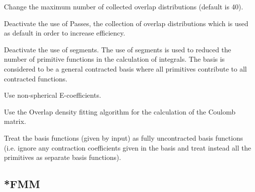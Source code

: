 \begin{description}
Change the maximum number of collected overlap distributions (default is 40).
\item[\Key{NO PASS}] Deactivate the use of Passes, the collection of overlap distributions which is used as default in order to increase efficiency. 
\item[\Key{NOSEGMENT}] Deactivate the use of segments. The use of segments is used to reduced the number of primitive functions in the calculation of integrals. The basis is considered to be a general contracted basis where all primitives contribute to all contracted functions. 
\item[\Key{NSETUV}] Use non-spherical E-coefficients.
\item[\Key{OVERLAP-DF-J}] Use the Overlap density fitting algorithm for the calculation of the Coulomb matrix.
\item[\Key{UNCONT}] Treat the basis functions (given by input) as fully uncontracted basis functions (i.e. ignore
any contraction coefficients given in the basis and treat instead all the primitives as separate basis functions).
\end{description}

\subsection{*FMM}\label{subsec:denfit}

